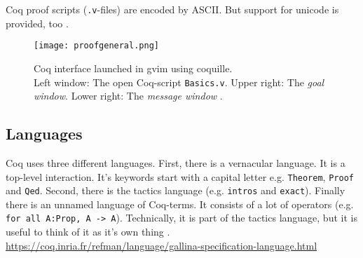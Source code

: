 Coq proof scripts (\texttt{.v}-files) are encoded by ASCII. But support for unicode is provided, too \cite{GallinaSpec}.


\begin{figure}[h]
\texttt{[image: proofgeneral.png]}
\caption{Coq interface launched in gvim using coquille.\\ 
Left window: The open Coq-script \texttt{Basics.v}.
Upper right: The {\itshape goal window}. 
Lower right: The {\itshape message window} \cite{COQIDE}.}
\label{fig:proofGeneral}
\end{figure}


\subsection{Languages}
\label{subsec:languages}

Coq uses three different languages. 
First, there is a vernacular language. 
It is a top-level interaction. 
It's keywords start with a capital letter e.g. \lstinline!Theorem!, \lstinline!Proof! and  \lstinline!Qed!. 
Second, there is the tactics language (e.g. \lstinline!intros! and \lstinline!exact!).
Finally there is an unnamed language of Coq-terms. 
It consists of a lot of operators (e.g. \lstinline!for all A:Prop, A -> A!).
Technically, it is part of the tactics language, but it is useful to think of it as it's own thing \cite{coq}.
\url{https://coq.inria.fr/refman/language/gallina-specification-language.html}
